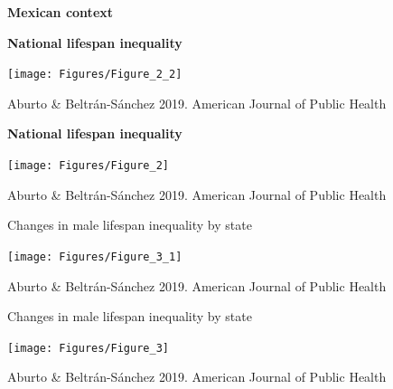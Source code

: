 \documentclass[xcolor={dvipsnames}]{beamer}
\begin{document}
\begin{frame}
\begin{center}
\Huge{\textbf{Mexican context}}
\end{center}

\end{frame}



\begin{frame}
	\begin{center}
		\Large{\textbf{National lifespan inequality}}
	\end{center}

	\hspace*{-1cm}   
	\texttt{[image: Figures/Figure\_2\_2]}
	
	\tiny{Aburto \& Beltr\'an-S\'anchez 2019. American Journal of Public Health}
\end{frame}


\begin{frame}
	\begin{center}
		\Large{\textbf{National lifespan inequality}}
	\end{center}

	\hspace*{-1cm}   
	\texttt{[image: Figures/Figure\_2]}
	
	\tiny{Aburto \& Beltr\'an-S\'anchez 2019. American Journal of Public Health}

\end{frame}


\begin{frame}
	\begin{center}
		\Large{{Changes in male lifespan inequality by state}}

		\texttt{[image: Figures/Figure\_3\_1]}
		\end{center}
		
		\vspace*{-.5cm}
		\tiny{Aburto \& Beltr\'an-S\'anchez 2019. American Journal of Public Health}

\end{frame}

\begin{frame}
	\begin{center}
		\Large{{Changes in male lifespan inequality by state}}

		\texttt{[image: Figures/Figure\_3]}
		\end{center}
		
		\vspace*{-.5cm}
\tiny{Aburto \& Beltr\'an-S\'anchez 2019. American Journal of Public Health}
\end{frame}
\end{document}
